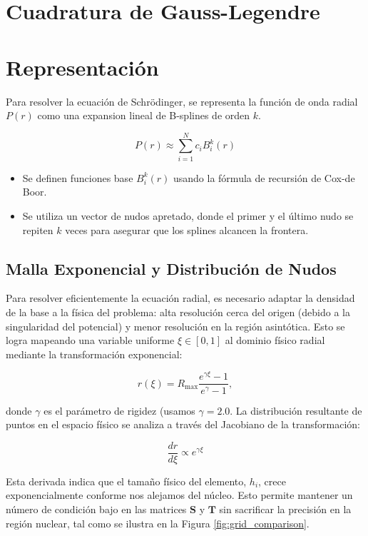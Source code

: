\documentclass[12pt, a4paper, oneside, spanish]{book}
\begin{document}
\section{Cuadratura de Gauss-Legendre}


\section{Representación}

Para resolver la ecuación de Schrödinger, se representa la función de onda radial \( P(r) \) como una expansion lineal de B-splines de orden \( k \).

\[ P(r) \approx \sum_{i=1}^N c_iB_i^k(r) \]

\begin{itemize}
\item Se definen funciones base \( B_i^k(r) \) usando la fórmula de recursión de Cox-de Boor.
\item Se utiliza un vector de nudos apretado, donde el primer y el último nudo se repiten \( k \) veces para asegurar que los splines alcancen la frontera.
\end{itemize}

\subsection{Malla Exponencial y Distribución de Nudos}

Para resolver eficientemente la ecuación radial, es necesario adaptar la densidad de la base a la física del problema: alta resolución cerca del origen (debido a la singularidad del potencial) y menor resolución en la región asintótica. Esto se logra mapeando una variable uniforme $\xi \in [0,1]$ al dominio físico radial mediante la transformación exponencial:

\begin{equation}
\label{eq:exp-grid}
    r(\xi) = R_{\text{max}} \frac{e^{\gamma \xi}-1}{e^{\gamma}-1},
\end{equation}

donde $\gamma$ es el parámetro de rigidez (usamos $\gamma=2.0$. La distribución resultante de puntos en el espacio físico se analiza a través del Jacobiano de la transformación:

\begin{equation}
    \frac{dr}{d\xi} \propto e^{\gamma \xi}
\end{equation}

Esta derivada indica que el tamaño físico del elemento, $h_i$, crece exponencialmente conforme nos alejamos del núcleo. Esto permite mantener un número de condición bajo en las matrices $\mathbf{S}$ y $\mathbf{T}$ sin sacrificar la precisión en la región nuclear, tal como se ilustra en la Figura \cref{fig:grid_comparison}.
\end{document}
